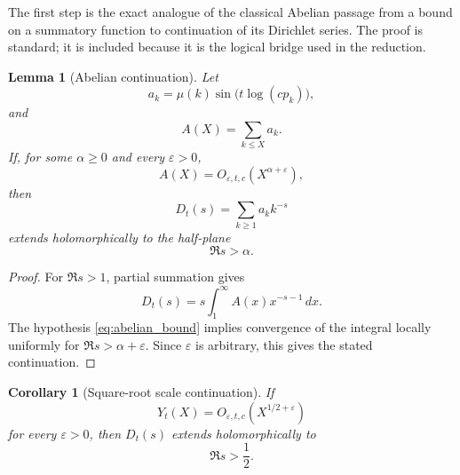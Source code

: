 \documentclass[11pt]{amsart}
\numberwithin{equation}{section}
\theoremstyle{plain}
\newtheorem{lemma}[theorem]{Lemma}
\newtheorem{corollary}[theorem]{Corollary}
\theoremstyle{definition}
\theoremstyle{remark}
\begin{document}
The first step is the exact analogue of the classical Abelian passage
from a bound on a summatory function to continuation of its Dirichlet
series.  The proof is standard; it is included because it is the logical
bridge used in the reduction.

\begin{lemma}[Abelian continuation]
\label{lem:abelian_continuation}
Let
\begin{equation}
a_k=\mu(k)\sin\bigl(t\log(c p_k)\bigr),
\label{eq:abelian_ak_definition}
\end{equation}
and
\begin{equation}
A(X)=\sum_{k\le X}a_k.
\label{eq:abelian_A_definition}
\end{equation}
If, for some $\alpha\ge0$ and every $\varepsilon>0$,
\begin{equation}
A(X)=O_{\varepsilon,t,c}(X^{\alpha+\varepsilon}),
\label{eq:abelian_bound}
\end{equation}
then
\begin{equation}
D_t(s)=\sum_{k\ge1}a_k k^{-s}
\label{eq:abelian_Dt_series}
\end{equation}
extends holomorphically to the half-plane
\begin{equation}
\Re s>\alpha.
\label{eq:abelian_half_plane}
\end{equation}
\end{lemma}

\begin{proof}
For $\Re s>1$, partial summation gives
\begin{equation}
D_t(s)=s\int_1^\infty A(x)x^{-s-1}\,dx.
\label{eq:abelian_integral}
\end{equation}
The hypothesis \eqref{eq:abelian_bound} implies convergence of the
integral locally uniformly for $\Re s>\alpha+\varepsilon$.  Since
$\varepsilon$ is arbitrary, this gives the stated continuation.
\end{proof}

\begin{corollary}[Square-root scale continuation]
\label{cor:sqrt_continuation}
If
\begin{equation}
Y_t(X)=O_{\varepsilon,t,c}(X^{1/2+\varepsilon})
\label{eq:sqrt_scale_bound}
\end{equation}
for every $\varepsilon>0$, then $D_t(s)$ extends holomorphically to
\begin{equation}
\Re s>\frac12.
\label{eq:sqrt_half_plane}
\end{equation}
\end{corollary}
\end{document}
